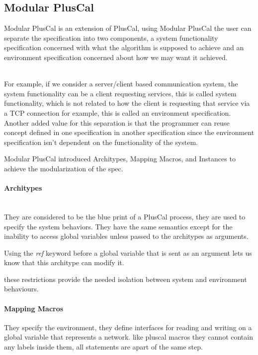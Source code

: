 \documentclass{thesul}
\begin{document}
\subsection{Modular PlusCal}

Modular PlusCal is an extension of PlusCal, using Modular PlusCal the user can separate the specification into two components, a system functionality specification concerned with what the algorithm is supposed to achieve and an environment specification concerned about how we may want it achieved.

\hfill\\

For example, if we consider a server/client based communication system, the system functionality can be a client requesting services, this is called system functionality, which is not related to how the client is requesting that service via a TCP connection for example, this is called an environment specification. Another added value for this separation is that the programmer can reuse concept defined in one specification in another specification since the environment specification isn't dependent on the functionality of the system.

Modular PlusCal introduced Architypes, Mapping Macros, and Instances to achieve the modularization of the spec.

\paragraph{\textbf{Architypes}}
\hfill\\
They are considered to be the blue print of a PlusCal process, they are used to specify the system behaviors. They have the same semantics except for the inability to access global variables unless passed to the architypes as arguments.

Using the \textit{ref} keyword before a global variable that is sent as an argument lets us know that this architype can modify it.

these restrictions provide the needed isolation between system and environment behaviours.

\paragraph{Mapping Macros}

They specify the environment, they define interfaces for reading and writing on a global variable that represents a network.
like pluscal macros they cannot contain any labels inside them, all statements are apart of the same step.
\end{document}
